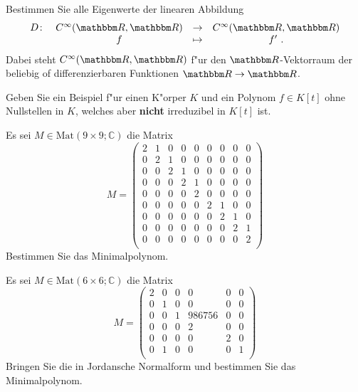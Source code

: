 \documentclass[a4,11pt]{article}
\begin{document}
\begin{aufgabe}[4 Punkte]
  Bestimmen Sie alle Eigenwerte der linearen Abbildung
  $$ \begin{array}{rccc}
       D \colon & C^\infty(\R,\R) &\to& C^\infty(\R,\R) \\
       & f &\mapsto& f' \ .
  \end{array} $$
  Dabei steht $C^\infty(\R,\R)$ f"ur den $\R$-Vektorraum der
  beliebig of differenzierbaren Funktionen $\R \to \R$.
\end{aufgabe}

\newpage

\begin{aufgabe}[4 Punkte]
  Geben Sie ein Beispiel f"ur einen K"orper $K$ und ein Polynom $f \in K[t]$ ohne
  Nullstellen in $K$, welches aber {\bfseries nicht} irreduzibel in $K[t]$ ist.
\end{aufgabe}

\newpage

\newpage

\begin{aufgabe}

Es sei $M \in \text{Mat}(9 \times 9; \mathbb{C})$ die Matrix
\[
M = 
\begin{pmatrix}
2 & 1 & 0 & 0 & 0 & 0 & 0 & 0 & 0\\
0 & 2 & 1 & 0 & 0 & 0 & 0 & 0 & 0\\
0 & 0 & 2 & 1 & 0 & 0 & 0 & 0 & 0\\
0 & 0 & 0 & 2 & 1 & 0 & 0 & 0 & 0\\
0 & 0 & 0 & 0 & 2 & 0 & 0 & 0 & 0\\
0 & 0 & 0 & 0 & 0 & 2 & 1 & 0 & 0\\
0 & 0 & 0 & 0 & 0 & 0 & 2 & 1 & 0\\
0 & 0 & 0 & 0 & 0 & 0 & 0 & 2 & 1\\
0 & 0 & 0 & 0 & 0 & 0 & 0 & 0 & 2\\

\end{pmatrix}
\]
Bestimmen Sie das Minimalpolynom.

\end{aufgabe}

\newpage

\begin{aufgabe}

Es sei $M \in \text{Mat}(6 \times 6; \mathbb{C})$ die Matrix
\[
M = 
\begin{pmatrix}
2 & 0 & 0 & 0 & 0 & 0 \\
0 & 1 & 0 & 0 & 0 & 0 \\
0 & 0 & 1 & 986756 & 0 & 0 \\
0 & 0 & 0 & 2 & 0 & 0 \\
0 & 0 & 0 & 0 & 2 & 0 \\
0 & 1 & 0 & 0 & 0 & 1 \\
\end{pmatrix}
\]
  Bringen Sie die in Jordansche Normalform und bestimmen Sie das Minimalpolynom.

  
\end{aufgabe}
\end{document}
